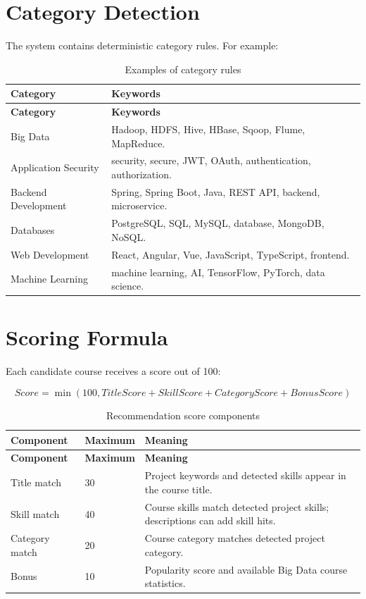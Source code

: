 \documentclass[12pt,a4paper]{report}
\begin{document}
\section{Category Detection}
The system contains deterministic category rules. For example:

\begin{longtable}{p{}p{}}
\caption{Examples of category rules}\\
\toprule
\textbf{Category} & \textbf{Keywords}\\
\midrule
\endfirsthead
\toprule
\textbf{Category} & \textbf{Keywords}\\
\midrule
\endhead
Big Data & Hadoop, HDFS, Hive, HBase, Sqoop, Flume, MapReduce.\\
Application Security & security, secure, JWT, OAuth, authentication, authorization.\\
Backend Development & Spring, Spring Boot, Java, REST API, backend, microservice.\\
Databases & PostgreSQL, SQL, MySQL, database, MongoDB, NoSQL.\\
Web Development & React, Angular, Vue, JavaScript, TypeScript, frontend.\\
Machine Learning & machine learning, AI, TensorFlow, PyTorch, data science.\\
\bottomrule
\end{longtable}

\section{Scoring Formula}
Each candidate course receives a score out of 100:

\begin{equation}
Score = \min(100, TitleScore + SkillScore + CategoryScore + BonusScore)
\end{equation}

\begin{longtable}{p{}p{}p{}}
\caption{Recommendation score components}\\
\toprule
\textbf{Component} & \textbf{Maximum} & \textbf{Meaning}\\
\midrule
\endfirsthead
\toprule
\textbf{Component} & \textbf{Maximum} & \textbf{Meaning}\\
\midrule
\endhead
Title match & 30 & Project keywords and detected skills appear in the course title.\\
Skill match & 40 & Course skills match detected project skills; descriptions can add skill hits.\\
Category match & 20 & Course category matches detected project category.\\
Bonus & 10 & Popularity score and available Big Data course statistics.\\
\bottomrule
\end{longtable}
\end{document}
